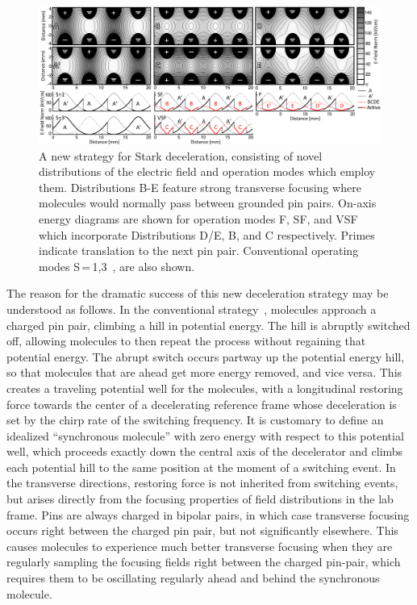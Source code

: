 \documentclass[%
 reprint,
 amsmath,amssymb,
 aps,
prl,
]{revtex4-1}
\begin{document}
\begin{figure}[t]
\includegraphics[width=\linewidth]{Configurations/pinpairformal6.png}%
\caption{
A new strategy for Stark deceleration, consisting of novel distributions of the electric field and operation modes which employ them. Distributions B-E feature strong transverse focusing where molecules would normally pass between grounded pin pairs. On-axis energy diagrams are shown for operation modes F, SF, and VSF which incorporate Distributions D/E, B, and C respectively. Primes indicate translation to the next pin pair. Conventional operating modes S\,=\,1,3~\cite{VanDeMeerakker2005a}, are also shown.\vspace{-4mm}
}
\label{fig:chargecartoon}
\end{figure}

The reason for the dramatic success of this new deceleration strategy may be understood as follows.
In the conventional strategy~\cite{VanDeMeerakker2012}, molecules approach a charged pin pair, climbing a hill in potential energy. 
The hill is abruptly switched off, allowing molecules to then repeat the process without regaining that potential energy.
The abrupt switch occurs partway up the potential energy hill, so that molecules that are ahead get more energy removed, and vice versa. 
This creates a traveling potential well for the molecules, with a longitudinal restoring force towards the center of a decelerating reference frame whose deceleration is set by the chirp rate of the switching frequency.
It is customary to define an idealized ``synchronous molecule'' with zero energy with respect to this potential well, which proceeds exactly down the central axis of the decelerator and climbs each potential hill to the same position at the moment of a switching event.
In the transverse directions, restoring force is not inherited from switching events, but arises directly from the focusing properties of field distributions in the lab frame.
Pins are always charged in bipolar pairs, in which case transverse focusing occurs right between the charged pin pair, but not significantly elsewhere.
This causes molecules to experience much better transverse focusing when they are regularly sampling the focusing fields right between the charged pin-pair, which requires them to be oscillating regularly ahead and behind the synchronous molecule.
\end{document}
